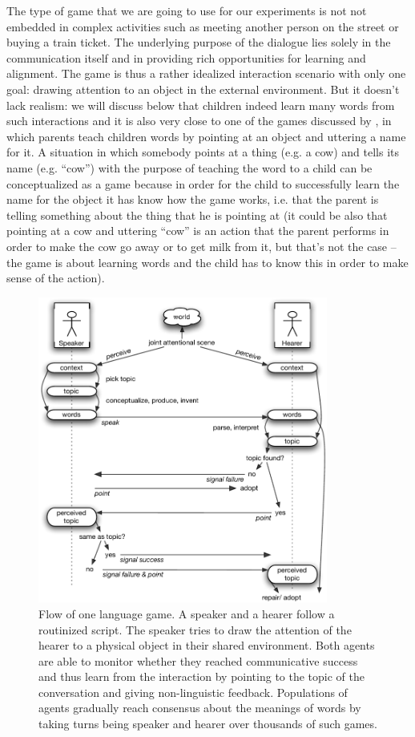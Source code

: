 The type of game that we are going to use for our experiments is not
not embedded in complex activities such as meeting another person on
the street or buying a train ticket. The underlying purpose of the
dialogue lies solely in the communication itself and in providing rich
opportunities for learning and alignment. The game is thus a rather
idealized interaction scenario with only one goal: drawing attention
to an object in the external environment. But it doesn't lack realism:
we will discuss below that children indeed learn many words from such
interactions and it is also very close to one of the games discussed
by \cite{wittgenstein67philosophische}, in which parents teach
children words by pointing at an object and uttering a name for it. A
situation in which somebody points at a thing (e.g. a cow) and tells
its name (e.g. ``cow'') with the purpose of teaching the word to a
child can be conceptualized as a game because in order for the child
to successfully learn the name for the object it has know how the game
works, i.e. that the parent is telling something about the thing that
he is pointing at (it could be also that pointing at a cow and
uttering ``cow'' is an action that the parent performs in order to
make the cow go away or to get milk from it, but that's not the case
-- the game is about learning words and the child has to know this in
order to make sense of the action).

\begin{figure}[t!]
  \centerline{\includegraphics[width=0.85\textwidth]{figures/guessing-game-flow}}
  \caption{Flow of one language game. A speaker and a hearer follow a
    routinized script. The speaker tries to draw the attention of the
    hearer to a physical object in their shared environment.  Both
    agents are able to monitor whether they reached communicative
    success and thus learn from the interaction by pointing to the
    topic of the conversation and giving non-linguistic feedback.
    Populations of agents gradually reach consensus about the meanings
    of words by taking turns being speaker and hearer over thousands
    of such games. }
  \label{f:guessing-game-flow}
\end{figure}


